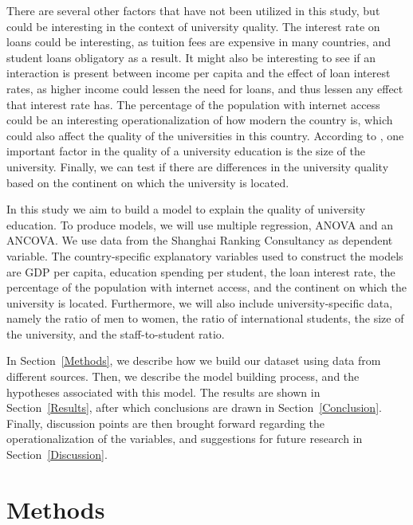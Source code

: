 \documentclass{stats_apa_style2}
\begin{document}
There are several other factors that have not been utilized in this study, but
could be interesting in the context of university quality. The interest rate on
loans could be interesting, as tuition fees are expensive in many countries, and
student loans obligatory as a result. It might also be interesting to see if an
interaction is present between income per capita and the
effect of loan interest rates, as higher income could lessen the need for loans, and thus lessen any effect that interest rate has. The percentage of the population with internet access could be an
interesting operationalization of how modern the country is, which could also
affect the quality of the universities in this country. According to
, one important factor in the quality of a university
education is the size of the university. Finally, we can test if there are differences in 
the university quality based on the continent on which the university is located.

In this study we aim to build a model to explain the quality of university
education. To produce models, we will use multiple regression, ANOVA and an ANCOVA.
We use data from the Shanghai Ranking Consultancy as dependent variable. The
country-specific explanatory variables used to construct the models are GDP per capita,
education spending per student, the loan interest rate, the percentage of the population with internet access, and
the continent on which the university is located. Furthermore, we will also
include university-specific data, namely the ratio of men to women, the ratio of
international students, the size of the university, and the staff-to-student
ratio.

In Section~\ref{Methods}, we describe how we build our dataset using data from
different sources. Then, we describe the model building process, and the
hypotheses associated with this model. The results are shown in
Section~\ref{Results}, after which conclusions are drawn in
Section~\ref{Conclusion}. Finally, discussion points are then brought forward
regarding the operationalization of the variables, and suggestions for future
research in Section~\ref{Discussion}.

\section*{Methods}
\label{Methods}
\end{document}
